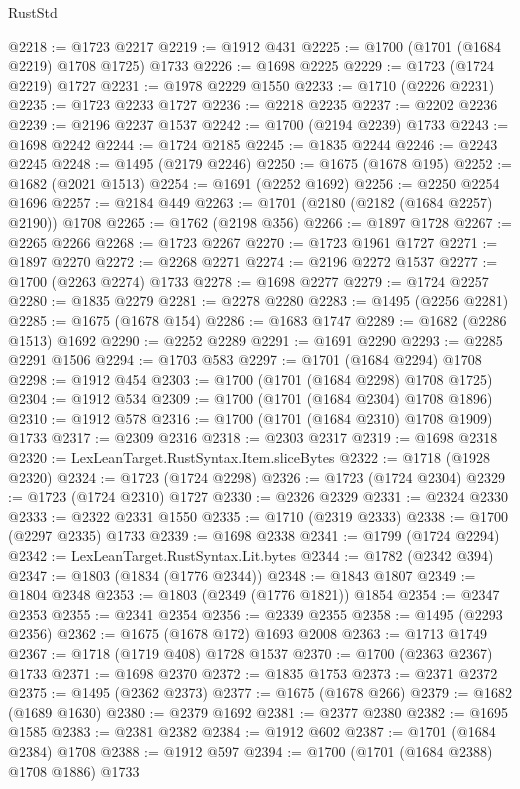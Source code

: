 \begin{lexlean}{RustStd}
\begin{coremodule}
@2218 := @1723 @2217
@2219 := @1912 @431
@2225 := @1700 (@1701 (@1684 @2219) @1708 @1725) @1733
@2226 := @1698 @2225
@2229 := @1723 (@1724 @2219) @1727
@2231 := @1978 @2229 @1550
@2233 := @1710 (@2226 @2231)
@2235 := @1723 @2233 @1727
@2236 := @2218 @2235
@2237 := @2202 @2236
@2239 := @2196 @2237 @1537
@2242 := @1700 (@2194 @2239) @1733
@2243 := @1698 @2242
@2244 := @1724 @2185
@2245 := @1835 @2244
@2246 := @2243 @2245
@2248 := @1495 (@2179 @2246)
@2250 := @1675 (@1678 @195)
@2252 := @1682 (@2021 @1513)
@2254 := @1691 (@2252 @1692)
@2256 := @2250 @2254 @1696
@2257 := @2184 @449
@2263 := @1701 (@2180 (@2182 (@1684 @2257) @2190)) @1708
@2265 := @1762 (@2198 @356)
@2266 := @1897 @1728
@2267 := @2265 @2266
@2268 := @1723 @2267
@2270 := @1723 @1961 @1727
@2271 := @1897 @2270
@2272 := @2268 @2271
@2274 := @2196 @2272 @1537
@2277 := @1700 (@2263 @2274) @1733
@2278 := @1698 @2277
@2279 := @1724 @2257
@2280 := @1835 @2279
@2281 := @2278 @2280
@2283 := @1495 (@2256 @2281)
@2285 := @1675 (@1678 @154)
@2286 := @1683 @1747
@2289 := @1682 (@2286 @1513) @1692
@2290 := @2252 @2289
@2291 := @1691 @2290
@2293 := @2285 @2291 @1506
@2294 := @1703 @583
@2297 := @1701 (@1684 @2294) @1708
@2298 := @1912 @454
@2303 := @1700 (@1701 (@1684 @2298) @1708 @1725)
@2304 := @1912 @534
@2309 := @1700 (@1701 (@1684 @2304) @1708 @1896)
@2310 := @1912 @578
@2316 := @1700 (@1701 (@1684 @2310) @1708 @1909) @1733
@2317 := @2309 @2316
@2318 := @2303 @2317
@2319 := @1698 @2318
@2320 := LexLeanTarget.RustSyntax.Item.sliceBytes
@2322 := @1718 (@1928 @2320)
@2324 := @1723 (@1724 @2298)
@2326 := @1723 (@1724 @2304)
@2329 := @1723 (@1724 @2310) @1727
@2330 := @2326 @2329
@2331 := @2324 @2330
@2333 := @2322 @2331 @1550
@2335 := @1710 (@2319 @2333)
@2338 := @1700 (@2297 @2335) @1733
@2339 := @1698 @2338
@2341 := @1799 (@1724 @2294)
@2342 := LexLeanTarget.RustSyntax.Lit.bytes
@2344 := @1782 (@2342 @394)
@2347 := @1803 (@1834 (@1776 @2344))
@2348 := @1843 @1807
@2349 := @1804 @2348
@2353 := @1803 (@2349 (@1776 @1821)) @1854
@2354 := @2347 @2353
@2355 := @2341 @2354
@2356 := @2339 @2355
@2358 := @1495 (@2293 @2356)
@2362 := @1675 (@1678 @172) @1693 @2008
@2363 := @1713 @1749
@2367 := @1718 (@1719 @408) @1728 @1537
@2370 := @1700 (@2363 @2367) @1733
@2371 := @1698 @2370
@2372 := @1835 @1753
@2373 := @2371 @2372
@2375 := @1495 (@2362 @2373)
@2377 := @1675 (@1678 @266)
@2379 := @1682 (@1689 @1630)
@2380 := @2379 @1692
@2381 := @2377 @2380
@2382 := @1695 @1585
@2383 := @2381 @2382
@2384 := @1912 @602
@2387 := @1701 (@1684 @2384) @1708
@2388 := @1912 @597
@2394 := @1700 (@1701 (@1684 @2388) @1708 @1886) @1733

\end{coremodule}
\end{lexlean}
